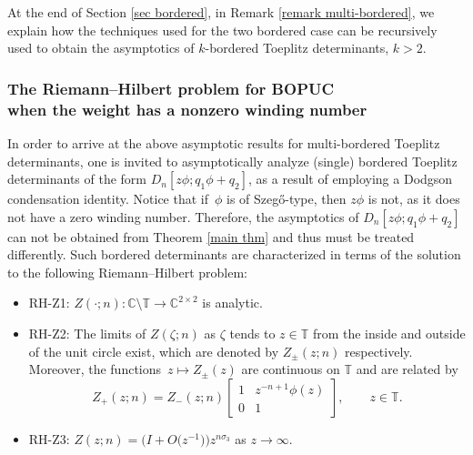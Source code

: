 \documentclass[10pt,a4paper]{amsart}
\numberwithin{equation}{section}
\newcommand{\C}{{\mathbb C}}
\newcommand{\T}{{\mathbb T}}
\newcommand{\ze}{\zeta}
\begin{document}
	
	At the end of Section \ref{sec bordered}, in Remark \ref{remark multi-bordered}, we explain how the techniques used for the two bordered case can be recursively used to obtain the asymptotics of $k$-bordered Toeplitz determinants, $k>2$.
	
	\subsubsection[The Riemann--Hilbert problem for BOPUC when the weight has\\ a nonzero winding number]{The Riemann--Hilbert problem for BOPUC\\ when the weight has a nonzero winding number}
	In order to arrive at the above asymptotic results for multi-bordered Toeplitz determinants, one is invited to asymptotically analyze (single) bordered Toeplitz determinants of the form $D_n[z\phi;q_1 \phi + q_2]$, as a result of employing a Dodgson condensation identity. Notice that if~$\phi$ is of Szeg\H{o}-type, then $z \phi$ is not, as it does not have a zero winding number. Therefore, the asymptotics of $D_n[z\phi;q_1 \phi + q_2]$ can not be obtained from Theorem \ref{main thm} and thus must be treated differently. Such bordered determinants are characterized in terms of the solution to the following Riemann--Hilbert problem:
	\begin{itemize}\itemsep=0pt
		\item RH-Z1: %
$Z(\cdot;n)\colon\C\setminus \T \to \C^{2\times2}$ is analytic.
		\item RH-Z2: %
The limits of $Z(\ze;n)$ as $\ze$ tends to $z \in \T $ from the inside and outside of the unit circle exist, which are denoted by $Z_{\pm}(z;n)$ respectively. Moreover, the functions~${z \mapsto Z_{\pm}(z)}$ are continuous on $\T$ and are related by
		\begin{equation*}
			Z_+(z;n)=Z_-(z;n)\begin{bmatrix}
				1 & z^{-n+1}\phi(z) \\
				0 & 1
			\end{bmatrix}, \qquad z \in \T.
		\end{equation*}
		
		\item RH-Z3: %
$Z(z;n)=\big( I + O\big(z^{-1}\big) \big) z^{n \sigma_3}$ as $z \to \infty$.
	\end{itemize}
\end{document}
